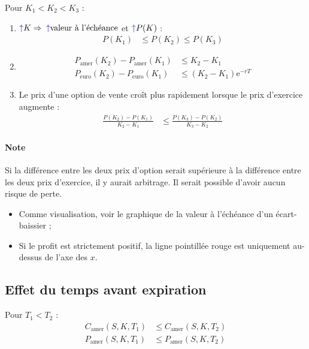 \documentclass[10pt, french]{article}
\begin{document}
\begin{multicols*}{2}
\begin{definitionNOHFILLsub}
Pour $K_{1}	<	K_{2}	<	K_{3}$ :
\begin{enumerate}
	\item	${\color{blue}\uparrow} K \Rightarrow$ ${\color{blue}\uparrow} \text{valeur à l'échéance}$ et ${\color{blue}\uparrow} P(K)$ :
			\begin{align*}
			P(K_{1})	&\leq	P(K_{2}) \leq	P(K_{3})
			\end{align*}
	\item	\begin{align*}
			P_{\text{amer}}(K_{2}) - P_{\text{amer}}(K_{1}) &\leq K_{2} - K_{1}	\\
			P_{\text{euro}}(K_{2}) - P_{\text{euro}}(K_{1}) &\leq (K_{2} - K_{1})\textrm{e}^{-rT}
			\end{align*}
	\item	Le prix d'une option de vente croît plus rapidement lorsque le prix d'exercice augmente :
			\begin{align*}
			\frac{P(K_{2}) - P(K_{1})}{K_{2} - K_{1}}
			&\leq
			\frac{P(K_{3}) - P(K_{2})}{K_{3} - K_{2}}	
			\end{align*}
\end{enumerate}
\end{definitionNOHFILLsub}

\paragraph{Note}	Si la différence entre les deux prix d'option serait supérieure à la différence entre les deux prix d'exercice, il y aurait arbitrage. Il serait possible d'avoir aucun risque de perte.
\begin{itemize}
	\item	Comme visualisation, voir le graphique de la valeur à l'échéance d'un écart-baissier ;
	\item	Si le profit est strictement positif, la ligne pointillée rouge est uniquement au-dessus de l'axe des $x$.
\end{itemize}


\columnbreak
\subsection{Effet du temps avant expiration}
Pour $T_{1}	<	T_{2}$ :
\begin{align*}
	C_{\text{amer}}(S, K, T_{1})	&\leq	C_{\text{amer}}(S, K, T_{2})	\\
	P_{\text{amer}}(S, K, T_{1})	&\leq	P_{\text{amer}}(S, K, T_{2})	\\
\end{align*}


\end{multicols*}
\end{document}
